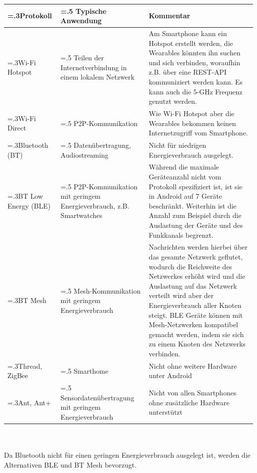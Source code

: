 \begin{minipage}{\linewidth}
        \renewcommand\footnoterule{}
        \renewcommand{\thefootnote}{\alph{footnote}}
	\label{tab:p2p_protocols}
	\begin{tabularx}{\linewidth}{>{\hsize=.3\hsize}X|>{\hsize=.5\hsize}X|X}
		Protokoll & Typische Anwendung & Kommentar\\
		\hline
		Wi-Fi Hotspot & Teilen der Internetverbindung in einem lokalem Netzwerk & Am Smartphone kann ein Hotspot erstellt werden, die Wearables könnten ihn suchen und sich verbinden, woraufhin z.B. über eine REST-API kommuniziert werden kann.
		Es kann auch die 5-GHz Frequenz genutzt werden.\\
		Wi-Fi Direct & P2P-Kommunikation & Wie Wi-Fi Hotspot aber die Wearables bekommen keinen Internetzugriff vom Smartphone.\\
		Bluetooth (BT) & Datenübertragung, Audiostreaming & Nicht für niedrigen Energieverbrauch ausgelegt.\\
		BT Low Energy (BLE) & P2P-Kommunikation mit geringem Energieverbrauch, z.B. Smartwatches & Während die maximale Geräteanzahl nicht vom Protokoll spezifiziert ist, ist sie in Android auf 7 Geräte beschränkt\footnotemark[1].
		Weiterhin ist die Anzahl zum Beispiel durch die Auslastung der Geräte und des Funkkanals begrenzt.\\
		BT Mesh & Mesh-Kommunikation mit geringem Energieverbrauch & Nachrichten werden hierbei über das gesamte Netzwerk geflutet, wodurch die Reichweite des Netzwerkes erhöht wird und die Auslastung auf das Netzwerk verteilt wird aber der Energieverbrauch aller Knoten steigt.
		BLE Geräte können mit Mesh-Netzwerken kompatibel gemacht werden, indem sie sich zu einem Knoten des Netzwerks verbinden.\\
		Thread, ZigBee & Smarthome & Nicht ohne weitere Hardware unter Android\\
		Ant, Ant+ & Sen\-sor\-da\-ten\-über\-tra\-gung mit geringem Energieverbrauch & Nicht von allen Smartphones ohne zusätzliche Hardware unterstützt\\
	\end{tabularx}
\end{minipage}\\\\
Da Bluetooth nicht für einen geringen Energieverbrauch ausgelegt ist, werden die Alternativen BLE und BT Mesh bevorzugt.
